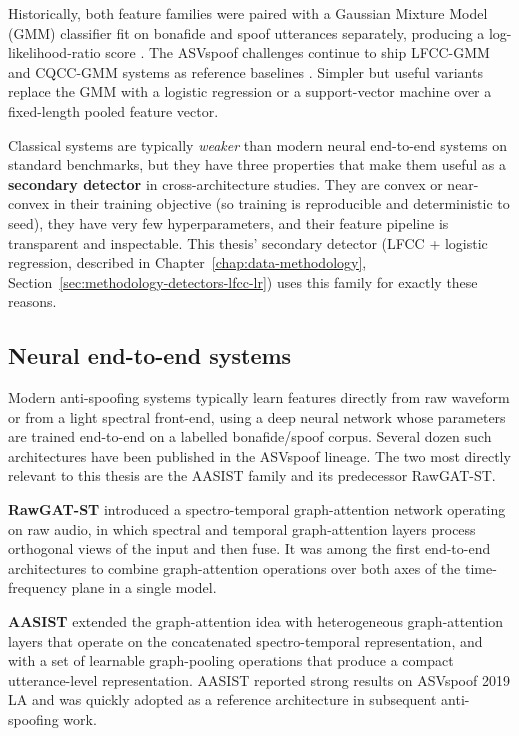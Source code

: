 Historically, both feature families were paired with a Gaussian
Mixture Model (GMM) classifier fit on bonafide and spoof
utterances separately, producing a log-likelihood-ratio score
\cite{Todisco2019_ASVspoof}. The ASVspoof challenges continue to
ship LFCC-GMM and CQCC-GMM systems as reference baselines
\cite{ASVspoof2019_Database}. Simpler but useful variants replace
the GMM with a logistic regression or a support-vector machine
over a fixed-length pooled feature vector.

Classical systems are typically \emph{weaker} than modern neural
end-to-end systems on standard benchmarks, but they have three
properties that make them useful as a \textbf{secondary detector}
in cross-architecture studies. They are convex or near-convex in
their training objective (so training is reproducible and
deterministic to seed), they have very few hyperparameters, and
their feature pipeline is transparent and inspectable. This
thesis' secondary detector (LFCC + logistic regression, described
in Chapter~\ref{chap:data-methodology},
Section~\ref{sec:methodology-detectors-lfcc-lr}) uses this family
for exactly these reasons.

\subsection{Neural end-to-end systems}
\label{sec:background-detectors-neural}

Modern anti-spoofing systems typically learn features directly
from raw waveform or from a light spectral front-end, using a deep
neural network whose parameters are trained end-to-end on a
labelled bonafide/spoof corpus. Several dozen such architectures
have been published in the ASVspoof lineage. The two most directly
relevant to this thesis are the AASIST family and its predecessor
RawGAT-ST.

\textbf{RawGAT-ST} \cite{Tak2021_RawGATST} introduced a
spectro-temporal graph-attention network operating on raw audio,
in which spectral and temporal graph-attention layers process
orthogonal views of the input and then fuse. It was among the
first end-to-end architectures to combine graph-attention
operations over both axes of the time-frequency plane in a single
model.

\textbf{AASIST} \cite{Jung2022_AASIST} extended the graph-attention
idea with heterogeneous graph-attention layers that operate on the
concatenated spectro-temporal representation, and with a set of
learnable graph-pooling operations that produce a compact
utterance-level representation. AASIST reported strong results on
ASVspoof 2019 LA and was quickly adopted as a reference
architecture in subsequent anti-spoofing work.

